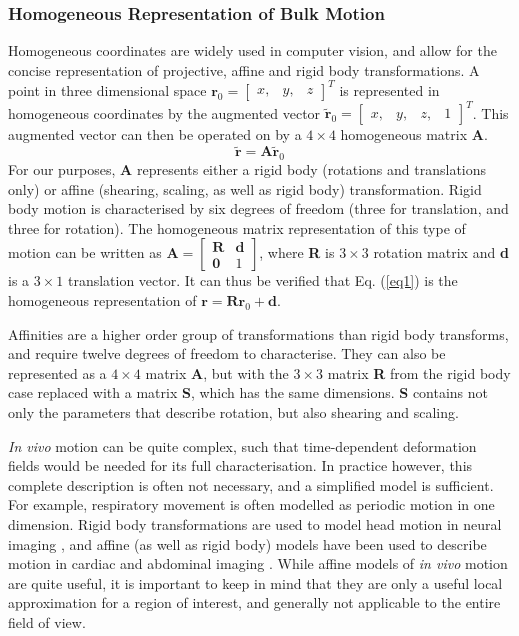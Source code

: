 \documentclass[class=article, crop=false]{standalone}
\begin{document}
\subsubsection{Homogeneous Representation of Bulk Motion}
Homogeneous coordinates are widely used in computer vision, and allow for the concise representation of projective, affine and rigid body transformations. A point in three dimensional space $\textbf{r}_0 = \begin{bmatrix} x,&y,&z\end{bmatrix}^{T}$ is represented in homogeneous coordinates by the augmented vector $\tilde{\textbf{r}}_0 = \begin{bmatrix}x,&y,&z,&1\end{bmatrix}^{T}$. This augmented vector can then be operated on by a $4\times4$ homogeneous matrix \textbf{A}.
\begin{equation}
	\label{eq1}
	\tilde{\textbf{r}} = \textbf{A}\tilde{\textbf{r}}_0
\end{equation}
For our purposes, \textbf{A} represents either a rigid body (rotations and translations only) or affine (shearing, scaling, as well as rigid body) transformation. Rigid body motion is characterised by six degrees of freedom (three for translation, and three for rotation). The homogeneous matrix representation of this type of motion can be written as $\textbf{A} = \begin{bmatrix} \textbf{R} & \textbf{d} \\ \textbf{0} & 1 \end{bmatrix}$, where \textbf{R} is $3\times3$ rotation matrix and \textbf{d} is a $3\times1$ translation vector. It can thus be verified that Eq. (\ref{eq1}) is the homogeneous representation of $\textbf{r} = \textbf{R} \textbf{r}_0 + \textbf{d}$.
\par
Affinities are a higher order group of transformations than rigid body transforms, and require twelve degrees of freedom to characterise. They can also be represented as a $4\times4$ matrix \textbf{A}, but with the $3\times3$ matrix \textbf{R} from the rigid body case replaced with a matrix \textbf{S}, which has the same dimensions. \textbf{S} contains not only the parameters that describe rotation, but also shearing and scaling.
\par
\textit{In vivo} motion can be quite complex, such that time-dependent deformation fields would be needed for its full characterisation. In practice however, this complete description is often not necessary, and a simplified model is sufficient. For example, respiratory movement is often modelled as periodic motion in one dimension. Rigid body transformations are used to model head motion in neural imaging \parencite{Godenschweger2016}, and affine (as well as rigid body) models have been used to describe motion in cardiac and abdominal imaging \parencite{Henningsson2014,Nehrke2005,Manke2002}. While affine models of \textit{in vivo} motion are quite useful, it is important to keep in mind that they are only a useful local approximation for a region of interest, and generally not applicable to the entire field of view.
\end{document}
